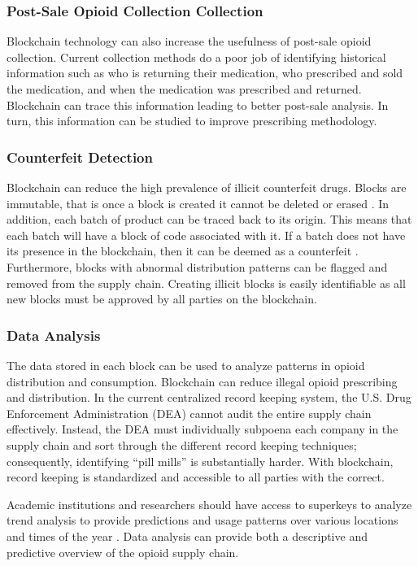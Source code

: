 \documentclass[sigconf]{acmart}
\begin{document}
\subsubsection{Post-Sale Opioid Collection Collection} Blockchain technology can also increase the usefulness of post-sale opioid collection. Current collection methods do a poor job of identifying historical information such as who is returning their medication, who prescribed and sold the medication, and when the medication was prescribed and returned. Blockchain can trace this information leading to better post-sale analysis. In turn, this information can be studied to improve prescribing methodology.
\subsubsection{Counterfeit Detection} Blockchain can reduce the high prevalence of illicit counterfeit drugs. Blocks are immutable, that is once a block is created it cannot be deleted or erased \cite{hitchingHealthcare}. In addition, each batch of product can be traced back to its origin. This means that each batch will have a block of code associated with it. If a batch does not have its presence in the blockchain, then it can be deemed as a counterfeit \cite{arbc2}. Furthermore, blocks with abnormal distribution patterns can be flagged and removed from the supply chain. Creating illicit blocks is easily identifiable as all new blocks must be approved by all parties on the blockchain. 
\subsubsection{Data Analysis} The data stored in each block can be used to analyze patterns in opioid distribution and consumption. Blockchain can reduce illegal opioid prescribing and distribution. In the current centralized record keeping system, the U.S. Drug Enforcement Administration (DEA) cannot audit the entire supply chain effectively. Instead, the DEA must individually subpoena each company in the supply chain and sort through the different record keeping techniques; consequently, identifying ``pill mills'' is substantially harder. With blockchain, record keeping is standardized and accessible to all parties with the correct.

Academic institutions and researchers should have access to superkeys to analyze trend analysis to provide predictions and usage patterns over various locations and times of the year \cite{arbc5}. Data analysis can provide both a descriptive and predictive overview of the opioid supply chain. 
\end{document}
